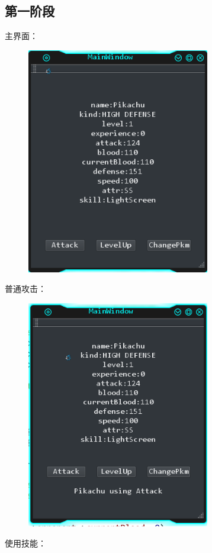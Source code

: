 \documentclass{ctexart}
\begin{document}
\subsection{第一阶段}
主界面：
\begin{figure}[H]
  \centering
  \includegraphics[width=8cm]{stage1-main.png}
\end{figure}
\pagebreak[4]
普通攻击：
\begin{figure}[H]
  \centering
  \includegraphics[width=8cm]{stage1-normalAttack.png}
\end{figure}
使用技能：
\end{document}
